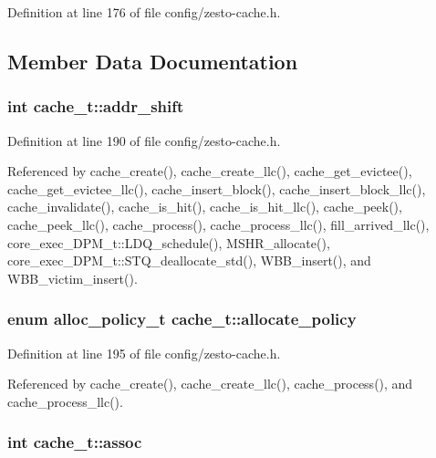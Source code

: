 Definition at line 176 of file config/zesto-cache.h.

\subsection{Member Data Documentation}
\subsubsection[{addr\_\-shift}]{\setlength{\rightskip}{0pt plus 5cm}int {\bf cache\_\-t::addr\_\-shift}}\label{structcache__t_2537c4668603eddef78b14fc0238266c}




Definition at line 190 of file config/zesto-cache.h.

Referenced by cache\_\-create(), cache\_\-create\_\-llc(), cache\_\-get\_\-evictee(), cache\_\-get\_\-evictee\_\-llc(), cache\_\-insert\_\-block(), cache\_\-insert\_\-block\_\-llc(), cache\_\-invalidate(), cache\_\-is\_\-hit(), cache\_\-is\_\-hit\_\-llc(), cache\_\-peek(), cache\_\-peek\_\-llc(), cache\_\-process(), cache\_\-process\_\-llc(), fill\_\-arrived\_\-llc(), core\_\-exec\_\-DPM\_\-t::LDQ\_\-schedule(), MSHR\_\-allocate(), core\_\-exec\_\-DPM\_\-t::STQ\_\-deallocate\_\-std(), WBB\_\-insert(), and WBB\_\-victim\_\-insert().
\subsubsection[{allocate\_\-policy}]{\setlength{\rightskip}{0pt plus 5cm}enum {\bf alloc\_\-policy\_\-t} {\bf cache\_\-t::allocate\_\-policy}}\label{structcache__t_9b1289db83dbcf6b7841c031504cbb0d}




Definition at line 195 of file config/zesto-cache.h.

Referenced by cache\_\-create(), cache\_\-create\_\-llc(), cache\_\-process(), and cache\_\-process\_\-llc().
\subsubsection[{assoc}]{\setlength{\rightskip}{0pt plus 5cm}int {\bf cache\_\-t::assoc}}\label{structcache__t_66e2ce7af7e66e2048486d30550b02f1}




